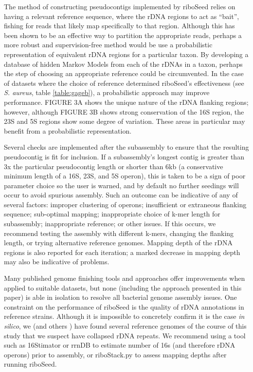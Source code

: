 \documentclass[10pt]{article}
\begin{document}
\begin{linenumbers}
The method of constructing pseudocontigs implemented by riboSeed relies on having a relevant reference sequence, where the rDNA regions to act as ``bait'', fishing for reads that likely map specifically to that region. Although this has been shown to be an effective way to partition the appropriate reads, perhaps a more robust and supervision-free method would be use a probabilistic representation of equivalent rDNA regions for a particular taxon. By developing a database of hidden Markov Models from each of the rDNAs in a taxon, perhaps the step of choosing an appropriate reference could be circumvented. In the case of datasets where the choice of reference determined riboSeed’s effectiveness (see \textit{S. aureus}, table \ref{table:gageb}), a probabilistic approach may improve performance. FIGURE 3A shows the unique nature of the rDNA flanking regions; however, although FIGURE 3B shows strong conservation of the 16S region, the 23S and 5S regions show some degree of variation. These areas in particular may benefit from a probabilistic representation.


Several checks are implemented after the subassembly to ensure that the resulting pseudocontig is fit for inclusion. If a subassembly’s longest contig is greater than 3x the particular pseudocontig length or shorter than 6kb (a conservative minimum length of a 16S, 23S, and 5S operon), this is taken to be a sign of poor parameter choice so the user is warned, and by default no further seedings will occur to avoid spurious assembly. Such an outcome can be indicative of any of several factors: improper clustering of operons; insufficient or extraneous flanking sequence; sub-optimal mapping; inappropriate choice of k-mer length for subassembly; inappropriate reference; or other issues. If this occurs, we recommend testing the assembly with different k-mers, changing the flanking length, or trying alternative reference genomes. Mapping depth of the rDNA regions is also reported for each iteration; a marked decrease in mapping depth may also be indicative of problems.


Many published genome finishing tools and approaches offer improvements when applied to suitable datasets, but none (including the approach presented in this paper) is able in isolation to resolve all bacterial genome assembly issues. One constraint on the performance of riboSeed is the quality of rDNA annotations in reference strains. Although it is impossible to concretely confirm it is the case \textit{in silico}, we (and others \cite{Mariano2016}) have found several reference genomes of the course of this study that we suspect have collapsed rDNA repeats. We recommend using a tool such as 16Stimator\cite{Perisin2016} or rrnDB\cite{Stoddard2014} to estimate number of 16s (and therefore rDNA operons) prior to assembly, or riboStack.py to assess mapping depths after running riboSeed.


\end{linenumbers}
\end{document}
